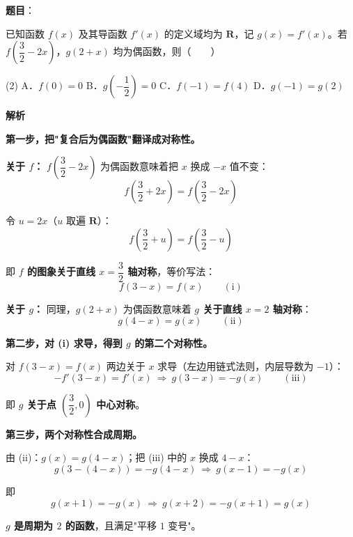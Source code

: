 \begin{answer}

\textbf{题目}：

已知函数 $f(x)$ 及其导函数 $f'(x)$ 的定义域均为 $\mathbf R$，记 $g(x)=f'(x)$。若 $f\left(\dfrac32-2x\right)$，$g(2+x)$ 均为偶函数，则\mbox{（　　）}

\begin{gkopts}(2)
\task A．$f(0)=0$
\task B．$g\left(-\dfrac12\right)=0$
\task C．$f(-1)=f(4)$
\task D．$g(-1)=g(2)$
\end{gkopts}

\textbf{解析}

\textbf{第一步，把"复合后为偶函数"翻译成对称性。}

\textbf{关于 $f$：} $f\left(\dfrac32-2x\right)$ 为偶函数意味着把 $x$ 换成 $-x$ 值不变：
\nopagebreak[4]
\[f\left(\frac32+2x\right)=f\left(\frac32-2x\right)\]

令 $u=2x$（$u$ 取遍 $\mathbf R$）：
\nopagebreak[4]
\[f\left(\frac32+u\right)=f\left(\frac32-u\right)\]

即 \textbf{$f$ 的图象关于直线 $x=\dfrac32$ 轴对称}，等价写法：
\nopagebreak[4]
\[f(3-x)=f(x)\qquad(\text{i})\]

\textbf{关于 $g$：} 同理，$g(2+x)$ 为偶函数意味着 \textbf{$g$ 关于直线 $x=2$ 轴对称}：
\nopagebreak[4]
\[g(4-x)=g(x)\qquad(\text{ii})\]

\textbf{第二步，对 (i) 求导，得到 $g$ 的第二个对称性。}

对 $f(3-x)=f(x)$ 两边关于 $x$ 求导（左边用链式法则，内层导数为 $-1$）：
\nopagebreak[4]
\[-f'(3-x)=f'(x)\ \Longrightarrow\ g(3-x)=-g(x)\qquad(\text{iii})\]

即 \textbf{$g$ 关于点 $\left(\dfrac32,0\right)$ 中心对称}。

\textbf{第三步，两个对称性合成周期。}

由 (ii)：$g(x)=g(4-x)$；把 (iii) 中的 $x$ 换成 $4-x$：
\nopagebreak[4]
\[g\left(3-(4-x)\right)=-g(4-x)\ \Longrightarrow\ g(x-1)=-g(x)\]

即
\nopagebreak[4]
\[g(x+1)=-g(x)\ \Longrightarrow\ g(x+2)=-g(x+1)=g(x)\]

\textbf{$g$ 是周期为 $2$ 的函数}，且满足"平移 $1$ 变号"。

\par\medskip


\end{answer}
